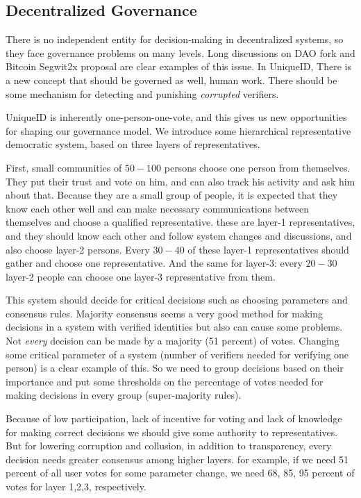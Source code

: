 \documentclass[conference]{IEEEtran}
\begin{document}
\subsection{Decentralized Governance}
There is no independent entity for decision-making in decentralized systems, so they face governance problems on many levels. Long discussions on  DAO fork and Bitcoin Segwit2x proposal are clear examples of this issue. In UniqueID, There is a new concept that should be governed as well, human work. There should be some mechanism for detecting and punishing \textit{corrupted} verifiers.


UniqueID is inherently one-person-one-vote, and this gives us new opportunities for shaping our governance model. We introduce some hierarchical representative democratic system, based on three layers of representatives. 


First, small communities of $50-100$ persons choose one person from themselves. They put their trust and vote on him, and can also track his activity and ask him about that. Because they are a small group of people, it is expected that they know each other well and can make necessary communications between themselves and choose a qualified representative. these are layer-1 representatives, and they should know each other and follow system changes and discussions, and also choose layer-2 persons. Every $30-40$ of these layer-1 representatives should gather and choose one representative. And the same for layer-3: every $20-30$ layer-2 people can choose one layer-3 representative from them. 



This system should decide for critical decisions such as choosing parameters and consensus rules. Majority consensus seems a very good method for making decisions in a system with verified identities but also can cause some problems. Not \textit{every} decision can be made by a majority (51 percent) of votes. Changing some critical parameter of a system (number of verifiers needed for verifying one person) is a clear example of this. So we need to group decisions based on their importance and put some thresholds on the percentage of votes needed for making decisions in every group (super-majority rules).


Because of low participation, lack of incentive for voting and lack of knowledge for making correct decisions we should give some authority to representatives. But for lowering corruption and collusion, in addition to transparency, every decision needs greater consensus among higher layers. for example, if we need 51 percent of all user votes for some parameter change, we need 68, 85, 95 percent of votes for layer 1,2,3, respectively.
\end{document}
